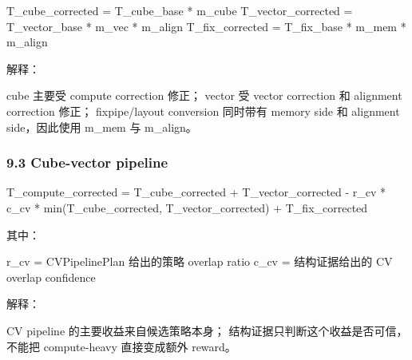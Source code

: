 \documentclass[
  10pt,
]{article}
\newenvironment{Shaded}{}{}
\newcommand{\NormalTok}[1]{#1}
\begin{document}
\begin{Shaded}
\begin{Highlighting}[]
\NormalTok{T\_cube\_corrected   = T\_cube\_base   * m\_cube}
\NormalTok{T\_vector\_corrected = T\_vector\_base * m\_vec * m\_align}
\NormalTok{T\_fix\_corrected    = T\_fix\_base    * m\_mem * m\_align}
\end{Highlighting}
\end{Shaded}

解释：

\begin{Shaded}
\begin{Highlighting}[]
\NormalTok{cube 主要受 compute correction 修正；}
\NormalTok{vector 受 vector correction 和 alignment correction 修正；}
\NormalTok{fixpipe/layout conversion 同时带有 memory side 和 alignment side，因此使用 m\_mem 与 m\_align。}
\end{Highlighting}
\end{Shaded}

\subsubsection{9.3 Cube-vector pipeline}\label{cube-vector-pipeline}

\begin{Shaded}
\begin{Highlighting}[]
\NormalTok{T\_compute\_corrected =}
\NormalTok{    T\_cube\_corrected}
\NormalTok{  + T\_vector\_corrected}
\NormalTok{  {-} r\_cv * c\_cv * min(T\_cube\_corrected, T\_vector\_corrected)}
\NormalTok{  + T\_fix\_corrected}
\end{Highlighting}
\end{Shaded}

其中：

\begin{Shaded}
\begin{Highlighting}[]
\NormalTok{r\_cv = CVPipelinePlan 给出的策略 overlap ratio}
\NormalTok{c\_cv = 结构证据给出的 CV overlap confidence}
\end{Highlighting}
\end{Shaded}

解释：

\begin{Shaded}
\begin{Highlighting}[]
\NormalTok{CV pipeline 的主要收益来自候选策略本身；}
\NormalTok{结构证据只判断这个收益是否可信，不能把 compute{-}heavy 直接变成额外 reward。}
\end{Highlighting}
\end{Shaded}
\end{document}
